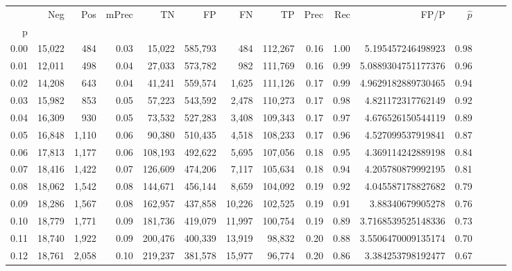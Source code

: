 \begin{tabular}{rrrrrrrrrrrrrrr}
\toprule
{} &     Neg &    Pos & mPrec &       TN &       FP &       FN &       TP &  Prec &   Rec &                  FP/P & $\hat{p}$ \\
p    &         &        &       &          &          &          &          &       &       &                       &           \\
\midrule
0.00 &  15,022 &    484 &  0.03 &   15,022 &  585,793 &      484 &  112,267 &  0.16 &  1.00 &     5.195457246498923 &      0.98 \\
0.01 &  12,011 &    498 &  0.04 &   27,033 &  573,782 &      982 &  111,769 &  0.16 &  0.99 &    5.0889304751177376 &      0.96 \\
0.02 &  14,208 &    643 &  0.04 &   41,241 &  559,574 &    1,625 &  111,126 &  0.17 &  0.99 &    4.9629182889730465 &      0.94 \\
0.03 &  15,982 &    853 &  0.05 &   57,223 &  543,592 &    2,478 &  110,273 &  0.17 &  0.98 &     4.821172317762149 &      0.92 \\
0.04 &  16,309 &    930 &  0.05 &   73,532 &  527,283 &    3,408 &  109,343 &  0.17 &  0.97 &     4.676526150544119 &      0.89 \\
0.05 &  16,848 &  1,110 &  0.06 &   90,380 &  510,435 &    4,518 &  108,233 &  0.17 &  0.96 &     4.527099537919841 &      0.87 \\
0.06 &  17,813 &  1,177 &  0.06 &  108,193 &  492,622 &    5,695 &  107,056 &  0.18 &  0.95 &     4.369114242889198 &      0.84 \\
0.07 &  18,416 &  1,422 &  0.07 &  126,609 &  474,206 &    7,117 &  105,634 &  0.18 &  0.94 &     4.205780879992195 &      0.81 \\
0.08 &  18,062 &  1,542 &  0.08 &  144,671 &  456,144 &    8,659 &  104,092 &  0.19 &  0.92 &     4.045587178827682 &      0.79 \\
0.09 &  18,286 &  1,567 &  0.08 &  162,957 &  437,858 &   10,226 &  102,525 &  0.19 &  0.91 &      3.88340679905278 &      0.76 \\
0.10 &  18,779 &  1,771 &  0.09 &  181,736 &  419,079 &   11,997 &  100,754 &  0.19 &  0.89 &    3.7168539525148336 &      0.73 \\
0.11 &  18,740 &  1,922 &  0.09 &  200,476 &  400,339 &   13,919 &   98,832 &  0.20 &  0.88 &    3.5506470009135174 &      0.70 \\
0.12 &  18,761 &  2,058 &  0.10 &  219,237 &  381,578 &   15,977 &   96,774 &  0.20 &  0.86 &     3.384253798192477 &      0.67 \\

\end{tabular}
